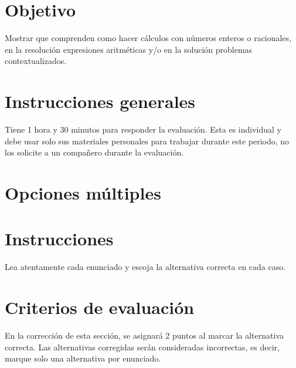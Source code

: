 \documentclass[]{srs}
\begin{document}
\section*{Objetivo}

Mostrar que comprenden como hacer cálculos con números enteros o racionales,
en la resolución expresiones aritméticas y/o en la solución problemas contextualizados.

\section*{Instrucciones generales}
  Tiene 1 hora y 30 minutos para responder la evaluación. Esta es individual y debe
  usar solo sus materiales personales para trabajar durante este periodo, no los solicite
  a un compañero durante la evaluación.

\section{Opciones múltiples}

\section*{Instrucciones}
Lea atentamente cada enunciado y escoja la alternativa correcta en cada caso.

\section*{Criterios de evaluación}
En la corrección de esta sección, se asignará 2 puntos al marcar la alternativa correcta.
Las alternativas corregidas serán consideradas incorrectas, es decir, marque solo una
alternativa por enunciado.

\separador[2mm]

\def\casilla{\tcbox[on line, boxsep=0pt, top=7pt, bottom=7pt, left=7pt, right=7pt,
box align=center,baseline=5pt,colback=white]{}}
\end{document}
